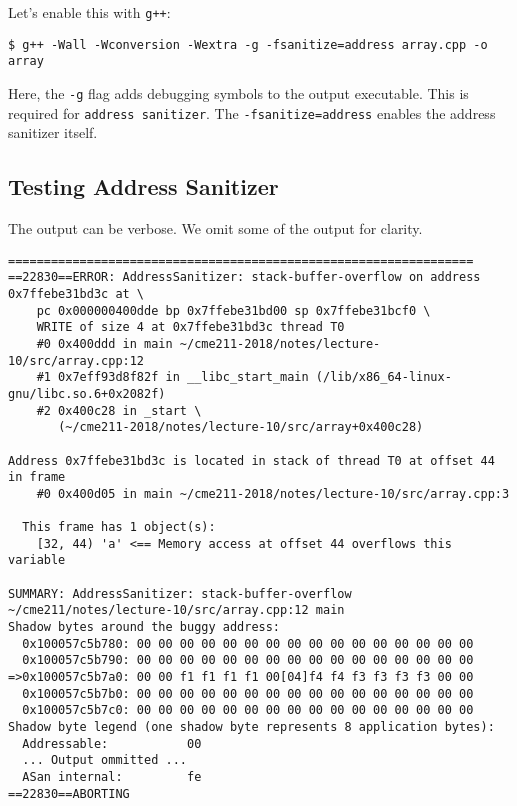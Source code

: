 \documentclass[12pt,letterpaper,twoside]{article}
\begin{document}
Let's enable this with \texttt{g++}:

\begin{verbatim}
$ g++ -Wall -Wconversion -Wextra -g -fsanitize=address array.cpp -o array
\end{verbatim}
Here, the \texttt{-g} flag adds debugging symbols to the output
executable. This is required for \texttt{address sanitizer}.
The \texttt{-fsanitize=address} enables the address sanitizer itself.

\subsection{Testing Address Sanitizer}
The output can be verbose. We omit some of the output for clarity.

{\footnotesize
\begin{verbatim}
=================================================================
==22830==ERROR: AddressSanitizer: stack-buffer-overflow on address 0x7ffebe31bd3c at \
    pc 0x000000400dde bp 0x7ffebe31bd00 sp 0x7ffebe31bcf0 \
    WRITE of size 4 at 0x7ffebe31bd3c thread T0
    #0 0x400ddd in main ~/cme211-2018/notes/lecture-10/src/array.cpp:12
    #1 0x7eff93d8f82f in __libc_start_main (/lib/x86_64-linux-gnu/libc.so.6+0x2082f)
    #2 0x400c28 in _start \ 
       (~/cme211-2018/notes/lecture-10/src/array+0x400c28)

Address 0x7ffebe31bd3c is located in stack of thread T0 at offset 44 in frame
    #0 0x400d05 in main ~/cme211-2018/notes/lecture-10/src/array.cpp:3

  This frame has 1 object(s):
    [32, 44) 'a' <== Memory access at offset 44 overflows this variable

SUMMARY: AddressSanitizer: stack-buffer-overflow ~/cme211/notes/lecture-10/src/array.cpp:12 main
Shadow bytes around the buggy address:
  0x100057c5b780: 00 00 00 00 00 00 00 00 00 00 00 00 00 00 00 00
  0x100057c5b790: 00 00 00 00 00 00 00 00 00 00 00 00 00 00 00 00
=>0x100057c5b7a0: 00 00 f1 f1 f1 f1 00[04]f4 f4 f3 f3 f3 f3 00 00
  0x100057c5b7b0: 00 00 00 00 00 00 00 00 00 00 00 00 00 00 00 00
  0x100057c5b7c0: 00 00 00 00 00 00 00 00 00 00 00 00 00 00 00 00
Shadow byte legend (one shadow byte represents 8 application bytes):
  Addressable:           00
  ... Output ommitted ...
  ASan internal:         fe
==22830==ABORTING
\end{verbatim}
}
\end{document}
